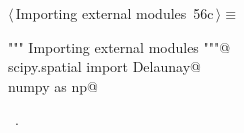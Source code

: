 \documentclass[11pt,oneside]{article}	%
\begin{document}
\begin{flushleft} \small \label{scrap101}
\protect{}$\langle\,$Importing external modules\nobreak\ {\footnotesize 56c}$\,\rangle\equiv$
\vspace{-1ex}
\begin{list}{}{} \item
\mbox{}\verb@""" Importing external modules """@\\
\mbox{}\verb@from scipy.spatial import Delaunay@\\
\mbox{}\verb@import numpy as np@\\
\mbox{}\verb@@{\NWsep}
\end{list}
\vspace{-1ex}
\footnotesize\addtolength{\baselineskip}{-1ex}
\begin{list}{}{\setlength{\itemsep}{-\parsep}\setlength{\itemindent}{-\leftmargin}}
\item \NWtxtMacroRefIn\ .
\end{list}
\end{flushleft}
\end{document}
